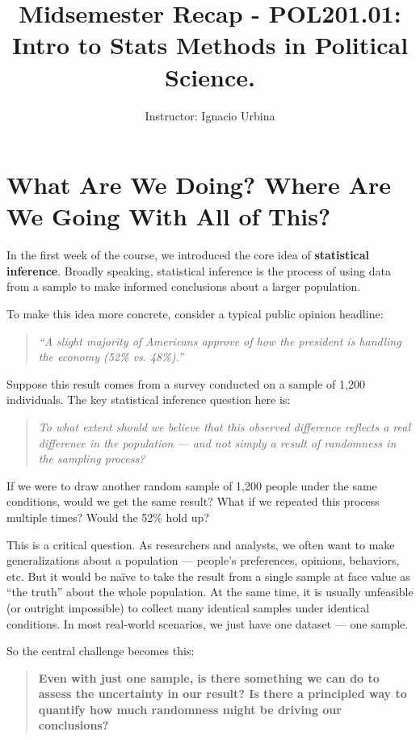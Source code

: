 \documentclass[12pt]{article}
\title{Midsemester Recap - POL201.01: Intro to Stats Methods in Political Science.}
\author{Instructor: Ignacio Urbina}
\date{}
\begin{document}
\maketitle
\vspace{-3em}

\section*{What Are We Doing? Where Are We Going With All of This?}

In the first week of the course, we introduced the core idea of \textbf{statistical inference}. Broadly speaking, statistical inference is the process of using data from a sample to make informed conclusions about a larger population.

To make this idea more concrete, consider a typical public opinion headline:

\begin{quote}
    \textit{``A slight majority of Americans approve of how the president is handling the economy (52\% vs. 48\%).''}
\end{quote}

Suppose this result comes from a survey conducted on a sample of 1,200 individuals. The key statistical inference question here is:

\begin{quote}
    \textit{To what extent should we believe that this observed difference reflects a real difference in the population — and not simply a result of randomness in the sampling process?}
\end{quote}

If we were to draw another random sample of 1,200 people under the same conditions, would we get the same result? What if we repeated this process multiple times? Would the 52\% hold up?

\vspace{0.5em}
This is a critical question. As researchers and analysts, we often want to make generalizations about a population — people's preferences, opinions, behaviors, etc. But it would be naïve to take the result from a single sample at face value as ``the truth'' about the whole population. At the same time, it is usually unfeasible (or outright impossible) to collect many identical samples under identical conditions. In most real-world scenarios, we just have one dataset — one sample.

So the central challenge becomes this:

\begin{quote}
    \textbf{Even with just one sample, is there something we can do to assess the uncertainty in our result? Is there a principled way to quantify how much randomness might be driving our conclusions?}
\end{quote}
\end{document}
